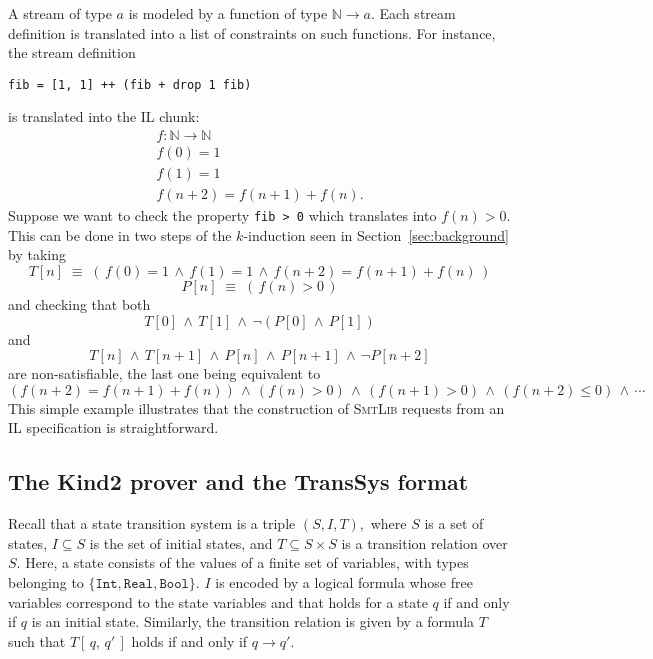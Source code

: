 A stream of type $a$ is modeled by a function of type $\mathbb{N} \to a$. Each stream definition is translated into a list of constraints on such functions. For instance, the stream definition
\begin{lstlisting}
fib = [1, 1] ++ (fib + drop 1 fib)
\end{lstlisting}
is translated into the IL chunk:
$$
\begin{array}{c}
f: \mathbb{N} \to \mathbb{N} \\
f(0) = 1 \\
f(1) = 1 \\
f(n + 2) = f(n + 1) + f(n).
\end{array}
$$
Suppose  we want to check the property \texttt{fib > 0} which translates into $f(n) > 0$. This can be done in two steps of the $k$-induction seen in Section~\ref{sec:background} by taking \[T[n] \;\equiv\; \left(\, f(0) = 1 \,\wedge\,
f(1) = 1 \,\wedge\, f(n + 2) = f(n + 1) + f(n) \,\right) \] \[P[n] \;\equiv\; \left(\, f(n) > 0 \,\right) \]
and checking that both \[T[0] \,\wedge\, T[1] \,\wedge\, \neg \left( P[0] \,\wedge\, P[1] \right) \] and \[T[n] \,\wedge\, T[n + 1] \,\wedge\, P[n] \,\wedge\, P[n + 1] \,\wedge\, \neg P[n + 2] \]
are non-satisfiable, the last one being equivalent to \[ \left(f(n+2) = f(n+1) + f(n)\right) \,\wedge\, \left(f(n) > 0\right) \,\wedge\, \left(f(n + 1) > 0\right) \,\wedge\, \left(f(n + 2) \leq 0\right)   \,\wedge\, \cdots \]
This simple example illustrates that  the construction of \textsc{SmtLib} requests from an IL specification is  straightforward.


\subsection{The Kind2 prover and the {TransSys} format}

Recall that a state transition system is a triple $(S,I,T),$
where $S$ is a set of states, $I \subseteq S$ is the set of initial
states, and $T \subseteq S \times S $ is a transition relation over $S$.
Here, a state consists of  the values of a finite set of variables, with types belonging to $\{ \texttt{Int}, \texttt{Real},  \texttt{Bool}\}$. $I$ is encoded by a logical formula whose free variables correspond to the state variables and that holds for a state $q$ if and only if $q$ is an initial state. Similarly, the transition relation is given by a formula $T$ such that $T\left[\, q, \, q' \,\right]$ holds if and only if $q \rightarrow q'$. 

\medskip

